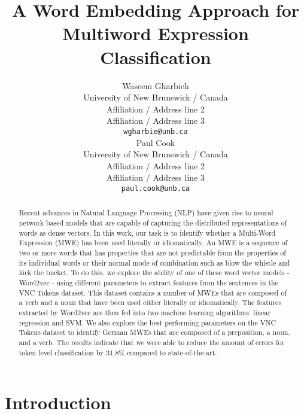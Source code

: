 \documentclass[11pt]{article}
\title{A Word Embedding Approach for Multiword Expression Classification}
\author{Waseem Gharbieh \\
  University of New Brunswick / Canada \\
  Affiliation / Address line 2 \\
  Affiliation / Address line 3 \\
  {\tt wgharbie@unb.ca} \\\And
  Paul Cook \\
  University of New Brunswick / Canada \\
  Affiliation / Address line 2 \\
  Affiliation / Address line 3 \\
  {\tt paul.cook@unb.ca} \\}
\date{}
\begin{document}
\maketitle
\begin{abstract}
Recent advances in Natural Language Processing (NLP) have given rise to neural network based models that are capable of capturing the distributed
representations of  words as dense vectors. In this work, our task is to
identify whether a Multi-Word Expression (MWE) has been used literally
or idiomatically. An MWE is a sequence of two or more words that has
properties that are not predictable from the properties of its
individual words or their normal mode of combination such as blow the
whistle and kick the bucket. To do this, we explore the ability of one
of these word vector models - Word2vec - using different parameters to
extract features from the sentences in the VNC Tokens dataset. This
dataset contains a number of MWEs that are composed of a verb and a noun
that have been used either literally or idiomatically. The features
extracted by Word2vec are then fed into two machine learning algorithms:
linear regression and SVM. We also explore the best performing
parameters on the VNC Tokens dataset to identify German MWEs that are
composed of a preposition, a noun, and a verb. The results indicate that
we were able to reduce the amount of errors for token level classification by 31.8\% compared to state-of-the-art.

\end{abstract}

\section{Introduction}
\end{document}
